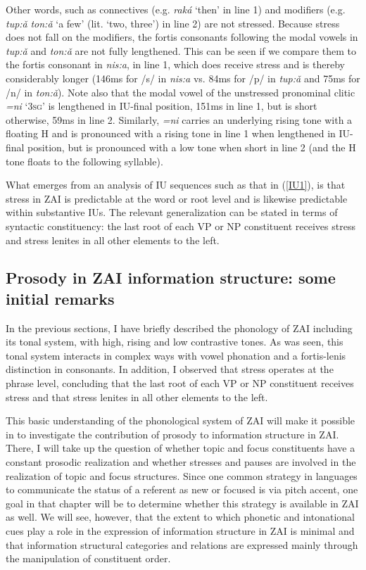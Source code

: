 Other words, such as connectives (e.g. \textit{rak\'{a}} `then' in line 1) and modifiers (e.g. \textit{tup:\v{a}} \textit{ton:\v{a}} `a few' (lit. `two, three') in line 2) are not stressed. Because stress does not fall on the modifiers, the fortis consonants following the modal vowels in \textit{tup:\v{a}} and \textit{ton:\v{a}} are not fully lengthened. This can be seen if we compare them to the fortis consonant in \textit{nis:a}, in line 1, which does receive stress and is thereby considerably longer (146ms for /s/ in \textit{nis:a} vs. 84ms for /p/ in \textit{tup:\v{a}} and 75ms for /n/ in \textit{ton:\v{a}}). Note also that the modal vowel of the unstressed pronominal clitic \textit{=ni} `3\textsc{sg}' is lengthened in IU-final position, 151ms in line 1, but is short otherwise, 59ms in line 2. Similarly, \textit{=ni}  carries an underlying rising tone with a floating H and is pronounced with a rising tone in line 1 when lengthened in IU-final position, but is pronounced with a low tone when short in line 2 (and the H tone floats to the following syllable).

What emerges from an analysis of IU sequences such as that in (\ref{IU1}), is that stress in ZAI is predictable at the word or root level and is likewise predictable within substantive IUs. The relevant generalization can be stated in terms of syntactic constituency: the last root of each VP or NP constituent receives stress and stress lenites in all other elements to the left. 


\subsection{Prosody in ZAI information structure: some initial remarks}\label{prosodyis}

In the previous sections, I have briefly described the phonology of ZAI including its tonal system, with high, rising and low contrastive tones. As was seen, this tonal system interacts in complex ways with vowel phonation and a fortis-lenis distinction in consonants. In addition, I observed that stress operates at the phrase level, concluding that the last root of each VP or NP constituent receives stress and that stress lenites in all other elements to the left. 

This basic understanding of the phonological system of ZAI will make it possible in  to investigate the contribution of prosody to information structure in ZAI. There, I will take up the question of whether topic and focus constituents have a constant prosodic realization and whether stresses and pauses are involved in the realization of topic and focus structures. Since one common strategy in languages to communicate the status of a referent as new or focused is via pitch accent, one goal in that chapter will be to determine whether this strategy is available in ZAI as well. We will see, however, that the extent to which phonetic and intonational cues play a role in the expression of information structure in ZAI is minimal and that information structural categories and relations are expressed mainly through the manipulation of constituent order.

